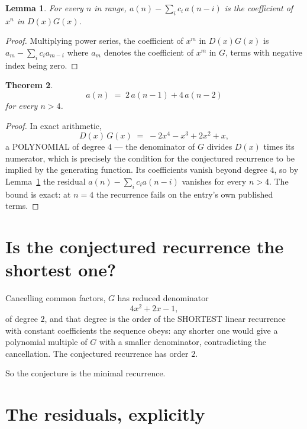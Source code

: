 \documentclass[11pt,a4paper]{article}
\theoremstyle{plain}
\newtheorem{theorem}{Theorem}
\newtheorem{lemma}[theorem]{Lemma}
\theoremstyle{definition}
\begin{document}
\begin{lemma}\label{lem:key}
For every $n$ in range, $a(n)-\sum_i c_i\,a(n-i)$ is the coefficient of $x^{n}$ in
$D(x)G(x)$.
\end{lemma}

\begin{proof}
Multiplying power series, the coefficient of $x^{m}$ in $D(x)G(x)$ is
$a_m-\sum_i c_i a_{m-i}$ where $a_m$ denotes the coefficient of $x^{m}$ in $G$, terms with
negative index being zero.
\end{proof}

\begin{theorem}
\[
a(n)\;=\;2\,a(n-1) + 4\,a(n-2)
\]
for every $n>4$.
\end{theorem}

\begin{proof}
In exact arithmetic,
\[
D(x)\,G(x)\;=\;- 2 x^{4} - x^{3} + 2 x^{2} + x,
\]
a POLYNOMIAL of degree $4$ --- the denominator of $G$ divides $D(x)$ times its numerator,
which is precisely the condition for the conjectured recurrence to be implied by the
generating function. Its coefficients vanish beyond degree $4$, so by
Lemma~\ref{lem:key} the residual $a(n)-\sum_ic_ia(n-i)$ vanishes for every
$n>4$. The bound is exact: at $n=4$ the recurrence fails on the entry's own published terms.
\end{proof}

\section{Is the conjectured recurrence the shortest one?}

Cancelling common factors, $G$ has reduced denominator
\[
4 x^{2} + 2 x - 1,
\]
of degree $2$, and that degree is the order of the SHORTEST linear recurrence with
constant coefficients the sequence obeys: any shorter one would give a polynomial multiple of
$G$ with a smaller denominator, contradicting the cancellation. The conjectured recurrence has
order $2$.

So the conjecture is the minimal recurrence.

\section{The residuals, explicitly}
\end{document}
